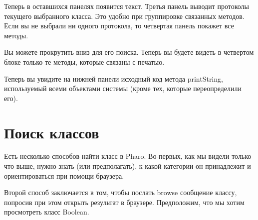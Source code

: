 \documentclass[a4paper,10pt,twoside]{book}
\begin{document}
Теперь в оставшихся панелях появится текст. Третья панель выводит
протоколы текущего выбранного класса. Это удобно при группировке
связанных методов. Если вы не выбрали ни одного протокола, то
четвертая панель покажет все методы. 


Вы можете прокрутить вниз для его поиска.  Теперь вы будете видеть в
четвертом блоке только те методы, которые связаны с печатью. 


Теперь вы увидите на нижней панели исходный код метода printString,
используемый всеми объектами системы (кроме тех, которые
переопределили его). 

\section{Поиск классов}


Есть несколько способов найти класс в Pharo. Во-первых, как мы видели
только что выше, нужно знать (или предполагать), к какой категории он
принадлежит и ориентироваться при помощи браузера.


Второй способ заключается в том, чтобы послать browse сообщение
классу, попросив при этом открыть результат в браузере.
Предположим, что мы хотим просмотреть класс Boolean. 
\end{document}
